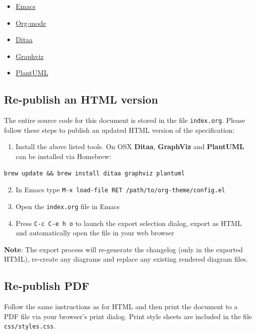 \documentclass[letterpaper, 9pt, onecolumn, twoside, technote, final]{IEEEtran}
\begin{document}
\begin{itemize}
\item \href{https://emacsformacosx.com/}{Emacs}
\item \href{http://orgmode.org}{Org-mode}
\item \href{http://ditaa.sourceforge.net}{Ditaa}
\item \href{http://graphviz.org}{Graphviz}
\item \href{http://plantuml.com/}{PlantUML}
\end{itemize}

\subsection{Re-publish an HTML version}
\label{sec:orge5619fb}

The entire source code for this document is stored in the file
\texttt{index.org}. Please follow these steps to publish an updated HTML
version of the specification:

\begin{enumerate}
\item Install the above listed tools. On OSX \textbf{Ditaa}, \textbf{GraphViz} and
\textbf{PlantUML} can be installed via Homebrew:
\end{enumerate}

\lstset{language=sh,label= ,caption= ,captionpos=b,numbers=none}
\begin{lstlisting}
brew update && brew install ditaa graphviz plantuml
\end{lstlisting}

\begin{enumerate}
\setcounter{enumi}{1}
\item In Emacs type \texttt{M-x load-file RET /path/to/org-theme/config.el}
\item Open the \texttt{index.org} file in Emacs
\item Press \texttt{C-c C-e h o} to launch the export selection dialog, export
as HTML and automatically open the file in your web browser
\end{enumerate}

\textbf{Note}: The export process will re-generate the changelog (only in the
exported HTML), re-create any diagrams and replace any existing
rendered diagram files.

\subsection{Re-publish PDF}
\label{sec:org2b679b6}

Follow the same instructions as for HTML and then print the document
to a PDF file via your browser's print dialog. Print style sheets are
included in the file \texttt{css/styles.css}.
\end{document}
